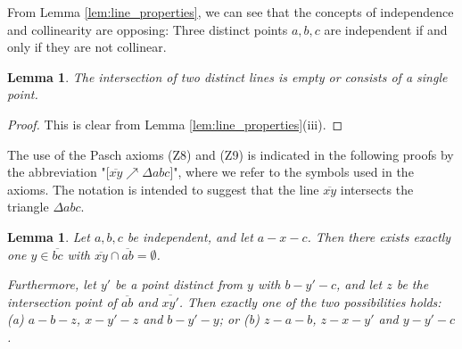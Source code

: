 \documentclass[11pt,a4paper]{article}
\newcommand{\betw}[3]{#1 - #2 - #3}
\newcommand{\lineab}[1]{\overline{#1}}
\newtheorem{lemma}[theorem]{Lemma}
\begin{document}
From Lemma \ref{lem:line_properties}, we can see that the concepts of independence and collinearity are opposing: Three distinct points $a, b, c$ are independent if and only if they are not collinear.

\begin{lemma} \label{lem:line_intersection}
The intersection of two distinct lines is empty or consists of a single point.
\end{lemma}
\begin{proof}
This is clear from Lemma \ref{lem:line_properties}(iii).
\end{proof}

The use of the Pasch axioms (Z8) and (Z9) is indicated in the following proofs by the abbreviation "[$\lineab{xy} \nearrow \Delta a b c$]", where we refer to the symbols used in the axioms. The notation is intended to suggest that the line $\lineab{xy}$ intersects the triangle $\Delta a b c$.

\begin{lemma} \label{lem:pasch_consequences}
Let $a, b, c$ be independent, and let $\betw{a}{x}{c}$. Then there exists exactly one $y \in \lineab{bc}$ with $\lineab{xy} \cap \lineab{ab} = \emptyset$.

Furthermore, let $y'$ be a point distinct from $y$ with $\betw{b}{y'}{c}$, and let $z$ be the intersection point of $\lineab{ab}$ and $\lineab{xy'}$. Then exactly one of the two possibilities holds: (a) $\betw{a}{b}{z}$, $\betw{x}{y'}{z}$ and $\betw{b}{y'}{y}$; or (b) $\betw{z}{a}{b}$, $\betw{z}{x}{y'}$ and $\betw{y}{y'}{c}$.
\end{lemma}
\end{document}
